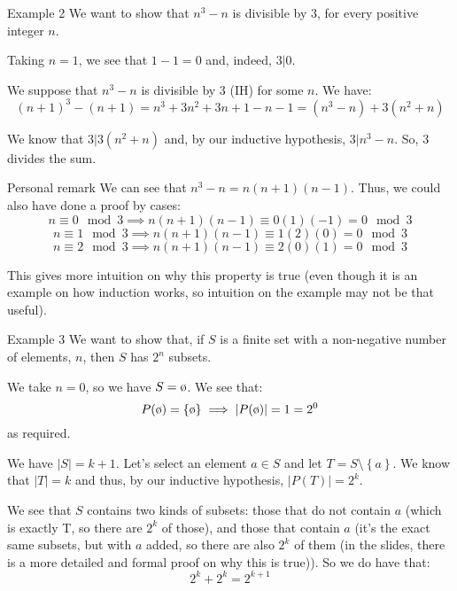 \documentclass[a4paper]{article}
\begin{document}
\begin{parag}{Example 2}
    We want to show that $n^3 - n$ is divisible by $3$, for every positive integer $n$.

     Taking $n = 1$, we see that $1 - 1 = 0$ and, indeed, $3 | 0$.

     We suppose that $n^3 - n$ is divisible by 3 (IH) for some $n$. We have:
    \[\left(n+1\right)^3 - \left(n+1\right) = n^3 + 3n^2 + 3n + 1 - n - 1 = \left(n^3 - n\right) + 3\left(n^2 + n\right)\]

    We know that $3 | 3\left(n^2 + n\right)$ and, by our inductive hypothesis, $3 | n^3 - n$. So, 3 divides the sum.

    \begin{subparag}{Personal remark}
        We can see that $n^3 - n = n\left(n+1\right)\left(n-1\right)$. Thus, we could also have done a proof by cases:
        \[n \equiv 0 \mod 3 \implies n\left(n+1\right)\left(n-1\right) \equiv 0\left(1\right)\left(-1\right) = 0 \mod 3\]
        \[n \equiv 1 \mod 3 \implies n\left(n+1\right)\left(n-1\right) \equiv 1\left(2\right)\left(0\right) = 0 \mod 3\]
        \[n \equiv 2 \mod 3 \implies n\left(n+1\right)\left(n-1\right) \equiv 2\left(0\right)\left(1\right) = 0 \mod 3\]

        This gives more intuition on why this property is true (even though it is an example on how induction works, so intuition on the example may not be that useful).
    \end{subparag}
\end{parag}

\begin{parag}{Example 3}
    We want to show that, if $S$ is a finite set with a non-negative number of elements, $n$, then $S$ has $2^{n}$ subsets.

     We take $n = 0$, so we have $S = \o$. We see that:
    \[P\left(\o\right) = \left\{\o\right\} \implies \left|P\left(\o\right)\right| = 1 = 2^0\]
    as required.

     We have $\left|S\right| = k + 1$. Let's select an element $a \in S$ and let $T = S \setminus \left\{a\right\}$. We know that $\left|T\right| = k$ and thus, by our inductive hypothesis, $\left|P\left(T\right)\right| = 2^k$.

    We see that $S$ contains two kinds of subsets: those that do not contain $a$ (which is exactly T, so there are $2^k$ of those), and those that contain $a$ (it's the exact same subsets, but with $a$ added, so there are also $2^k$ of them (in the slides, there is a more detailed and formal proof on why this is true)). So we do have that:
    \[2^k + 2^k = 2^{k+1}\]
\end{parag}
\end{document}
